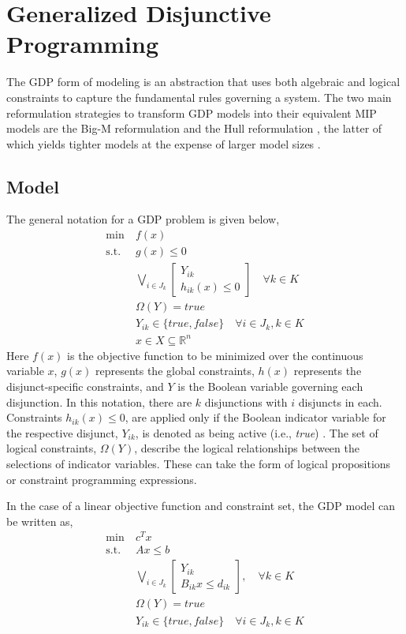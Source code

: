 \documentclass{juliacon}
\begin{document}
\section{Generalized Disjunctive Programming}
The GDP form of modeling is an abstraction that uses both algebraic and logical constraints to capture the fundamental rules governing a system. The two main reformulation strategies to transform GDP models into their equivalent MIP models are the Big-M reformulation \cite{nemhauser_1999, TRESPALACIOS201598} and the Hull reformulation \cite{LEE20002125}, the latter of which yields tighter models at the expense of larger model sizes \cite{grossmann_lee_2003}. 

\subsection{Model}

The general notation for a GDP problem is given below,
\begin{align*}
    \min \ &f(x) \\
    \text{s.t.} \ &g(x) \leq 0 \\
    &\bigvee_{i \in J_k}
    \begin{bmatrix}
        Y_{ik} \\
        h_{ik}(x) \leq 0
    \end{bmatrix} \quad \forall k \in K \\
    & \Omega(Y) = true \\
    & Y_{ik} \in \{true, false\} \quad \forall i \in J_k, k \in K\\
    & x \in X \subseteq \mathbb{R}^n
\end{align*}
Here $f(x)$ is the objective function to be minimized over the continuous variable $x$, $g(x)$ represents the global constraints, $h(x)$ represents the disjunct-specific constraints, and $Y$ is the Boolean variable governing each disjunction. In this notation, there are $k$ disjunctions with $i$ disjuncts in each. Constraints $h_{ik}(x) \le 0$, are applied only if the Boolean indicator variable for the respective disjunct, $Y_{ik}$, is denoted as being active (i.e., \textit{true}) \cite{chen_grossmann_2019}. The set of logical constraints, $\Omega(Y)$, describe the logical relationships between the selections of indicator variables. These can take the form of logical propositions or constraint programming expressions.

In the case of a linear objective function and constraint set, the GDP model can be written as,
\begin{align*}
    \min \ & c^Tx \\
    \text{s.t.} \ &Ax \leq b \\
    &\bigvee_{i \in J_k}
    \begin{bmatrix}
        Y_{ik} \\
       B_{ik}x \leq d_{ik}
    \end{bmatrix}, \quad \forall k \in K \\
    & \Omega(Y) = true \\
    & Y_{ik} \in \{true, false\} \quad \forall i \in J_k, k \in K
\end{align*}
\end{document}

